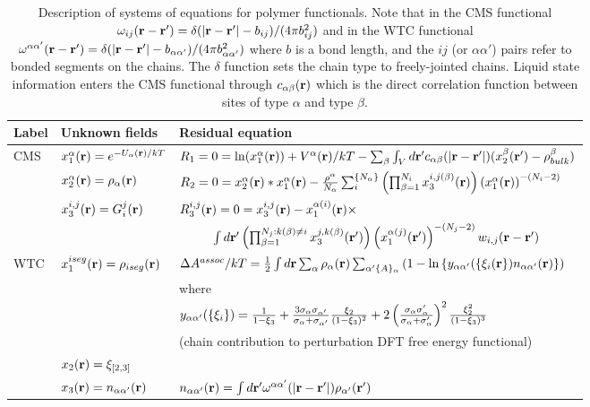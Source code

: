 \documentclass[10pt,onecolumn]{article}
\begin{document}
\begin{table}[h]
\center\begin{tabular}{|l|l|l|} \hline
Label & Unknown fields & Residual equation \\ \hline 
CMS & $x_1^\alpha({\bf r}) = e^{-U_\alpha({\bf r})/kT}$ &
$R_1=0= \ln(x_1^{\alpha}({\bf r})) +
V^\alpha({\bf r})/kT - \sum_\beta \int_V d {\bf r'}
c_{\alpha \beta}(|{\bf r} - {\bf r'}|)(x_2^\beta({\bf r'})-\rho^\beta_{bulk})$ \\ 
& $x_2^\alpha({\bf r}) = \rho_\alpha({\bf r})$ & 
$R_2=0 = x_2^\alpha({\bf r})*x_1^\alpha({\bf r}) -{\rho^\alpha \over N_\alpha} \sum_{i}^{\{N_\alpha\}}
\left(\prod_{\beta=1}^{N_i} x_3^{i,j(\beta)}({\bf r})\right) \left(x_1^\alpha({\bf r})\right)^{-(N_i-2)}$ \\
& $x_3^{i,j}({\bf r}) = G_i^j({\bf r})$ &
$R_3^{i,j}({\bf r}) = 0 = x_3^{i,j}({\bf r}) - x_1^{\alpha(i)}({\bf r}) \times$ \\
&& $\ \ \ \ \ \ \ \ \int d{\bf r'} \left( \prod_{\beta=1}^{N_j:k(\beta) \neq i}x_3^{j,k(\beta)}({\bf r'})
\right) \left(x_1^{\alpha(j)}({\bf r'})\right)^{-(N_j-2)} w_{i,j}({\bf r-r'})$ \\ 
\hline
WTC & $x_1^{iseg}({\bf r})=\rho_{iseg}({\bf r})$ & 
${{\Delta A^{assoc}}/{kT}}={1 \over 2}\int d{\bf r} \sum_{\alpha}\rho_{\alpha}({\bf r})
\sum_{\alpha'\{A\}_\alpha}\left(1- \ln\left\{y_{\alpha \alpha'}(\{\xi_i({\bf r}\})n_{\alpha \alpha'}({\bf r})\right\}\right)$ \\
& & where \\
& & $y_{\alpha\alpha'}(\{\xi_i\})={{1}\over{1-\xi_3}}+
{{3\sigma_\alpha\sigma_{\alpha'}}\over{\sigma_\alpha+\sigma_{\alpha'}}}{{\xi_2}\over{(1-\xi_3)^2}}
+2\left({{\sigma_\alpha \sigma_\alpha'}\over{\sigma_\alpha+\sigma_\alpha'}}\right)^2
{{\xi_2^2}\over{(1-\xi_3)^3}}$ \\
& & (chain contribution to perturbation DFT free energy functional) \\ 
&$x_2({\bf r})=\xi_{[2,3]}$ & \\
& $x_3({\bf r})=n_{\alpha \alpha'}({\bf r})$&  $n_{\alpha \alpha'}({\bf r})=\int d{\bf r}' \omega^{\alpha\alpha'}(|{\bf r}-{\bf r}'|) \rho_{\alpha'}({\bf r}')$ \\ \hline
 \end{tabular}
\caption{Description of systems of equations for polymer functionals.  Note that in the 
CMS functional $\omega_{ij}({\bf r-r'}) = {{\delta(|{\bf r - r'}| -b_{ij})}/({4\pi b_{ij}^2}})$ and in the
WTC functional $\omega^{\alpha\alpha'}({\bf r-r'}) = {{\delta(|{\bf r - r'}| -b_{\alpha\alpha'})}/({4\pi b_{\alpha\alpha'}^2}})$ where $b$ is a bond length, and the $ij$ (or $\alpha \alpha'$) pairs refer to bonded 
segments on the chains.  The $\delta$ function sets the chain type to
freely-jointed chains.  Liquid state information enters the CMS functional through  $c_{\alpha \beta}({\bf r})$ which is the direct correlation function between sites of type $\alpha$ and type $\beta$. }
\label{tab:polyoptions}
\end{table}
\end{document}
